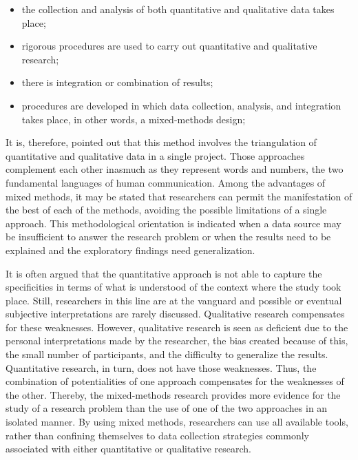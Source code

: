 \begin{itemize}
	\item the collection and analysis of both quantitative and qualitative data takes place;

	\item rigorous procedures are used to carry out quantitative and qualitative research;

	\item there is integration or combination of results;

	\item procedures are developed in which data collection, analysis, and integration takes place, in other words, a mixed-methods design;
\end{itemize}

It is, therefore, pointed out that this method involves the triangulation of quantitative and qualitative data in a single project. Those approaches complement each other inasmuch as they represent words and numbers, the two fundamental languages of human communication. Among the advantages of mixed methods, it may be stated that researchers can permit the manifestation of the best of each of the methods, avoiding the possible limitations of a single approach. This methodological orientation is indicated when a data source may be insufficient to answer the research problem or when the results need to be explained and the exploratory findings need generalization.

It is often argued that the quantitative approach is not able to capture the specificities in terms of what is understood of the context where the study took place. Still, researchers in this line are at the vanguard and possible or eventual subjective interpretations are rarely discussed. Qualitative research compensates for these weaknesses. However, qualitative research is seen as deficient due to the personal interpretations made by the researcher, the bias created because of this, the small number of participants, and the difficulty to generalize the results. Quantitative research, in turn, does not have those weaknesses. Thus, the combination of potentialities of one approach compensates for the weaknesses of the other. Thereby, the mixed-methods research provides more evidence for the study of a research problem than the use of one of the two approaches in an isolated manner. By using mixed methods, researchers can use all available tools, rather  than confining themselves to data collection strategies commonly associated with either quantitative or qualitative research. 

